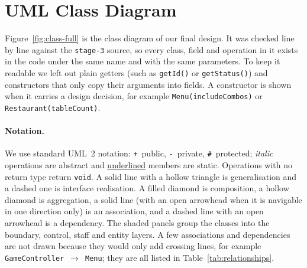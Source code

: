 \section{UML Class Diagram}
\label{sec:class}

Figure~\ref{fig:class-full} is the class diagram of our final design. It was checked line by line
against the \texttt{stage-3} source, so every class, field and operation in it exists in the code
under the same name and with the same parameters. To keep it readable we left out plain getters
(such as \texttt{getId()} or \texttt{getStatus()}) and constructors that only copy their
arguments into fields. A constructor is shown when it carries a design decision, for example
\texttt{Menu(includeCombos)} or \texttt{Restaurant(tableCount)}.

\paragraph{Notation.} We use standard UML~2 notation:
\texttt{+}~public, \texttt{-}~private, \texttt{\#}~protected;
\emph{italic} operations are abstract and \underline{underlined} members are static.
Operations with no return type return \texttt{void}.
A solid line with a hollow triangle is generalisation and a dashed one is interface realisation.
A filled diamond is composition, a hollow diamond is aggregation, a solid line (with an open
arrowhead when it is navigable in one direction only) is an association, and a dashed line with
an open arrowhead is a dependency. The shaded panels group the classes into the boundary, control,
staff and entity layers. A few associations and dependencies are not drawn because they would
only add crossing lines, for example \texttt{GameController}~$\rightarrow$~\texttt{Menu}; they are
all listed in Table~\ref{tab:relationships}.

